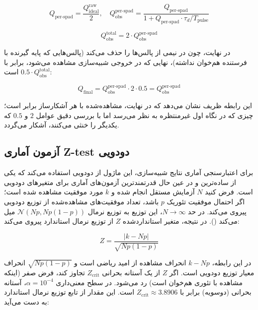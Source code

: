 \begin{equation}
	Q_{\text{per-spad}} = \frac{Q_{\text{ideal}}^{\text{raw}}}{2}, \quad Q_{\text{obs}}^{\text{per-spad}} = \frac{Q_{\text{per-spad}}}{1 + Q_{\text{per-spad}} \cdot \tau_d / T_{\text{pulse}}}
\end{equation}

\begin{equation}
	Q_{\text{obs}}^{\text{total}} = 2 \cdot Q_{\text{obs}}^{\text{per-spad}}
\end{equation}

در نهایت، چون  در  نیمی از پالس‌ها را حذف می‌کند (پالس‌هایی که پایه گیرنده با فرستنده هم‌خوان نداشته)،  نهایی که در خروجی شبیه‌سازی مشاهده می‌شود، برابر با $0.5 \cdot Q_{\text{obs}}^{\text{total}}$ است:

\begin{equation}
	Q_{\text{final}} = Q_{\text{obs}}^{\text{per-spad}} \cdot 2 \cdot 0.5 = Q_{\text{obs}}^{\text{per-spad}}
\end{equation}

این رابطه ظریف نشان می‌دهد که در نهایت،  مشاهده‌شده با  هر آشکارساز برابر است؛ چیزی که در نگاه اول غیرمنتظره به نظر می‌رسد اما با بررسی دقیق عوامل $2$ و $0.5$ که یکدیگر را خنثی می‌کنند، آشکار می‌گردد.

\subsection{آزمون آماری Z-test دودویی}

برای اعتبارسنجی آماری نتایج شبیه‌سازی، این ماژول از  دودویی استفاده می‌کند که یکی از ساده‌ترین و در عین حال قدرتمندترین آزمون‌های آماری برای متغیرهای دودویی است. فرض کنید $N$ آزمایش مستقل انجام شده و $k$ مورد موفقیت مشاهده شده است؛ اگر احتمال موفقیت تئوریک $p$ باشد، تعداد موفقیت‌های مشاهده‌شده از توزیع دودویی  پیروی می‌کند. در حد $N \to \infty$، این توزیع به توزیع نرمال $\mathcal{N}(Np, Np(1-p))$ میل می‌کند (). در نتیجه، متغیر استانداردشده $Z$ از توزیع نرمال استاندارد پیروی می‌کند:

\begin{equation}
	Z = \frac{|k - Np|}{\sqrt{Np(1-p)}}
\end{equation}

در این رابطه، $k - Np$ انحراف مشاهده از امید ریاضی است و $\sqrt{Np(1-p)}$ انحراف معیار توزیع دودویی است. اگر $Z$ از یک آستانه بحرانی $Z_{\text{crit}}$ تجاوز کند، فرض صفر (اینکه مشاهده با تئوری هم‌خوان است) رد می‌شود. در سطح معنی‌داری $\alpha = 10^{-4}$، آستانه بحرانی (دوسویه) برابر با $Z_{\text{crit}} \approx 3.8906$ است. این مقدار از تابع توزیع نرمال استاندارد به دست می‌آید:

